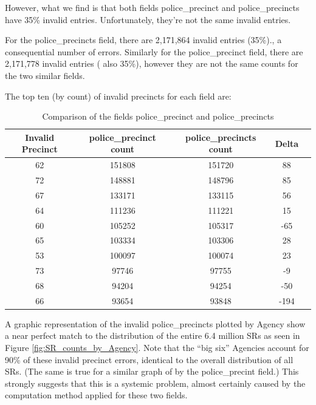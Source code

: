 \documentclass[12pt, titlepage]{article}
\begin{document}
{	However, what we find is that both fields police\_precinct and police\_precincts  have  35\% invalid entries.
	Unfortunately, they're not the same invalid entries. 
	
	For the police\_precincts field, there are 2,171,864 invalid entries (35\%)., a consequential number of errors. Similarly for the police\_precinct field,
	 there are 2,171,778 invalid entries ( also 35\%), however they are not the same counts for the two similar fields.

	The top ten (by count) of invalid precincts for each field are:

	\begin{table}[ht]
	\footnotesize
	\centering
		\begin{tabular}{ccccc}
		\toprule
		\textbf{Invalid Precinct} & \textbf{police\_precinct count} & \textbf{police\_precincts count} & \textbf{Delta}\\
		\midrule
			62 & 151808 & 151720 & 88 \\
			72 & 148881 & 148796 & 85 \\
			67 & 133171 & 133115 & 56 \\
			64 & 111236 & 111221 & 15 \\
			60 & 105252 & 105317 & -65 \\
			65 & 103334 & 103306 & 28 \\
			53 & 100097 & 100074 & 23 \\
			73 & 97746 & 97755 & -9 \\
			68 & 94204 & 94254 & -50 \\
			66 & 93654 & 93848 & -194 \\
		\bottomrule
		\end{tabular}
	\caption{Comparison of the fields police\_precinct and police\_precincts}
	\label{tab:comparison-precincts-diff}
	\end{table}
	
	A graphic representation of the invalid police\_precincts plotted by Agency show a near perfect match to the
	distribution of the entire 6.4 million SRs as seen in Figure \ref{fig:SR_counts_by_Agency}. Note that the ``big six'' Agencies account for 90\% of these invalid precinct errors, identical
	to the overall distribution of all SRs. (The same is true for a similar graph of by the police\_precint field.) This strongly suggests that this is a systemic problem, almost certainly caused by the computation method applied for these two fields.
	 
}
\end{document}
